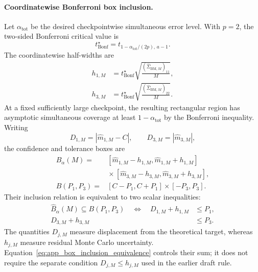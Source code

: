 \documentclass[showpacs,amsmath,amssymb,twocolumn,prx,superscriptaddress,10pt,aps,nofootinbib]{revtex4-2}
\begin{document}
\paragraph{Coordinatewise Bonferroni box inclusion.}
Let $\alpha_{\mathrm{tot}}$ be the desired checkpointwise simultaneous error level. With $p=2$, the two-sided Bonferroni critical value is
\begin{equation}
\label{eq:app_bonferroni_critical}
    t^\star_{\mathrm{Bonf}}
    =
    t_{1-\alpha_{\mathrm{tot}}/(2p),\,a-1}.
\end{equation}
The coordinatewise half-widths are
\begin{equation}
\label{eq:app_bonferroni_halfwidths}
\begin{aligned}
    h_{1,M}
    &=
    t^\star_{\mathrm{Bonf}}
    \sqrt{
        \frac{(\widehat\Sigma_{\mathrm{BM},M})_{11}}{M}
    },\\
    h_{3,M}
    &=
    t^\star_{\mathrm{Bonf}}
    \sqrt{
        \frac{(\widehat\Sigma_{\mathrm{BM},M})_{22}}{M}
    }.
\end{aligned}
\end{equation}
At a fixed sufficiently large checkpoint, the resulting rectangular region has asymptotic simultaneous coverage at least $1-\alpha_{\mathrm{tot}}$ by the Bonferroni inequality.
Writing
\begin{equation}
\label{eq:app_coordinate_distances}
    D_{1,M}
    =
    |\widehat m_{1,M}-C|,
    \qquad
    D_{3,M}
    =
    |\widehat m_{3,M}|,
\end{equation}
the confidence and tolerance boxes are
\begin{equation}
\label{eq:app_box_definitions}
\begin{aligned}
    \widehat B_\alpha(M)
    ={}&
    [\widehat m_{1,M}-h_{1,M},
     \widehat m_{1,M}+h_{1,M}]
    \\
    &{}\times
    [\widehat m_{3,M}-h_{3,M},
     \widehat m_{3,M}+h_{3,M}],\\
    B(P_1,P_3)
    ={}&
    [C-P_1,C+P_1]
    \times[-P_3,P_3].
\end{aligned}
\end{equation}
Their inclusion relation is equivalent to two scalar inequalities:
\begin{equation}
\label{eq:app_box_inclusion_equivalence}
\begin{aligned}
    \widehat B_\alpha(M)
    \subseteq B(P_1,P_3)
    \quad\Longleftrightarrow\quad
    D_{1,M}+h_{1,M}&\le P_1,\\
    D_{3,M}+h_{3,M}&\le P_3.
\end{aligned}
\end{equation}
The quantities $D_{j,M}$ measure displacement from the theoretical target, whereas $h_{j,M}$ measure residual Monte Carlo uncertainty. Equation~\eqref{eq:app_box_inclusion_equivalence} controls their sum; it does not require the separate condition $D_{j,M}\le h_{j,M}$ used in
the earlier draft rule.
\end{document}
